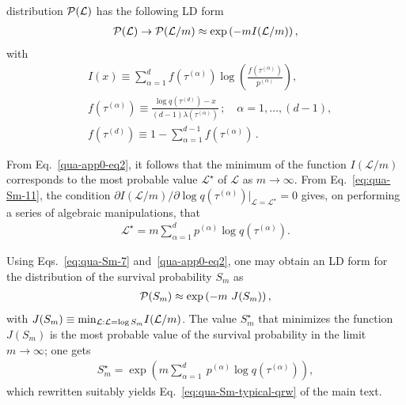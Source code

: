 \documentclass[12pt]{iopart}
\begin{document}
distribution ${\cal P}(\mathcal{L})$ has the following LD form~\cite{Gherardini:2016}
\begin{align}
{\cal P}(\mathcal{L}) \to  {\cal P}({\cal L}/m) \approx\exp \left(
        -mI({\mathcal{L}}/{m}) \right),
\label{qua-app0-eq2}
\end{align}
with 
\begin{align}
&I\left(x\right) \equiv \sum_{\alpha=1}^{d}f(\tau^{(\alpha)})\log\left(\frac{f(\tau^{(\alpha)})}{p^{(\alpha)}}\right), \label{eq:qua-Sm-11}
\\
&f(\tau^{(\alpha)}) \equiv \frac{\log q(\tau^{(d)})-x}{(d-1)\lambda(\tau^{(\alpha)})} \, ; \quad \alpha=1,\ldots,(d-1), \label{qua-appeq2} \\
&f(\tau^{(d)}) \equiv 1-\sum_{\alpha=1}^{d-1}f(\tau^{(\alpha)})  \, .
\end{align}

From Eq.~\eqref{qua-app0-eq2}, it follows that
the minimum of the function $I(\mathcal{L}/m)$ corresponds to the most probable value $\mathcal{L}^{\star}$ of
$\mathcal{L}$ as $m \to \infty$. From Eq.~\eqref{eq:qua-Sm-11}, the condition $\partial
I\left(\mathcal{L}/m\right)/\partial \log
q(\tau^{(\alpha)})|_{\mathcal{L}=\mathcal{L}^\star}=0$ gives, on
performing a series of algebraic manipulations, that~\cite{Gherardini:2016}
\begin{align}
\mathcal{L}^\star=m\sum_{\alpha=1}^{d} p^{(\alpha)}\log
q(\tau^{(\alpha)}).
\label{eq:qua-Sm-15}
\end{align}

Using Eqs.~\eqref{eq:qua-Sm-7} and~\eqref{qua-app0-eq2}, one may obtain
an LD form for the
distribution of the survival probability $S_m$ as~\cite{Gherardini:2016}
\begin{align}
{\cal P}(S_m)\approx\exp\left(-m ~J(S_m)\right),
        \label{eq:qua-Sm-16}
\end{align}
with $J(S_m)\equiv{\rm min}_{\mathcal{L}:\mathcal{L}=\log
S_m}I(\mathcal{L}/m)$. The value $S_m^\star$ that minimizes the function $J(S_m)$ is the most probable value of the
survival probability in the limit $m \to \infty$; one gets~\cite{Gherardini:2016}
\begin{align}
S_m^{\star}=\exp\left(m\sum_{\alpha=1}^{d} ~p^{(\alpha)}\log
        q(\tau^{(\alpha)})\right),
        \label{eq:qua-Sm-18}
\end{align}
which rewritten suitably yields Eq.~\eqref{eq:qua-Sm-typical-qrw} of the main text. 

\end{document}
